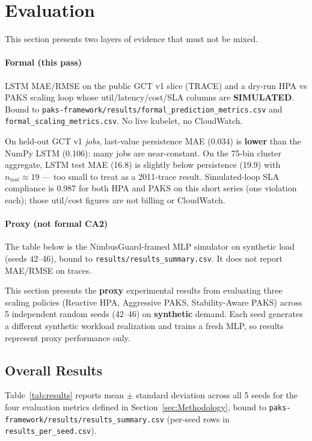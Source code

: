
\section{Evaluation}
\label{sec:Evaluation}

This section presents two layers of evidence that must not be mixed.

\paragraph{Formal (this pass)} LSTM MAE/RMSE on the public GCT v1 slice (TRACE) and a dry-run HPA vs PAKS scaling loop whose util/latency/cost/SLA columns are \textbf{SIMULATED}. Bound to \texttt{paks-framework/results/formal\_prediction\_metrics.csv} and \texttt{formal\_scaling\_metrics.csv}. No live kubelet, no CloudWatch.

On held-out GCT v1 \emph{jobs}, last-value persistence MAE (0.034) is \textbf{lower} than the NumPy LSTM (0.106): many jobs are near-constant. On the 75-bin cluster aggregate, LSTM test MAE (16.8) is slightly below persistence (19.9) with $n_{\text{test}}\approx 19$ --- too small to treat as a 2011-trace result. Simulated-loop SLA compliance is 0.987 for both HPA and PAKS on this short series (one violation each); those util/cost figures are not billing or CloudWatch.

\paragraph{Proxy (not formal CA2)} The table below is the NimbusGuard-framed MLP simulator on synthetic load (seeds 42--46), bound to \texttt{results/results\_summary.csv}. It does not report MAE/RMSE on traces.

This section presents the \textbf{proxy} experimental results from evaluating three scaling policies (Reactive HPA, Aggressive PAKS, Stability-Aware PAKS) across 5 independent random seeds (42--46) on \textbf{synthetic} demand. Each seed generates a different synthetic workload realization and trains a fresh MLP, so results represent proxy performance only.

\subsection{Overall Results}

Table~\ref{tab:results} reports mean $\pm$ standard deviation across all 5 seeds for the four evaluation metrics defined in Section~\ref{sec:Methodology}, bound to \texttt{paks-framework/results/results\_summary.csv} (per-seed rows in \texttt{results\_per\_seed.csv}).

